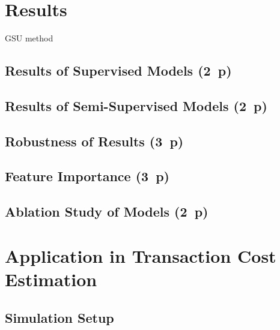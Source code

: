 \newpage
\section{Results}\label{sec:results}

\gls{GSU} method

\newpage


\newpage


\newpage



\subsection{Results of Supervised
    Models (2~p)}\label{sec:results-of-supervised-models}

\subsection{Results of Semi-Supervised
    Models (2~p)}\label{sec:results-of-semi-supervised-models}

\subsection{Robustness of Results (3~p)}\label{sec:robustness-checks}

\subsection{Feature Importance (3~p)}\label{sec:feature-importance}

\subsection{Ablation Study of Models (2~p)}\label{sec:ablation-study}

\newpage
\section{Application in Transaction Cost Estimation}\label{sec:application}
\subsection{Simulation Setup}\label{sec:simulation-setup}

